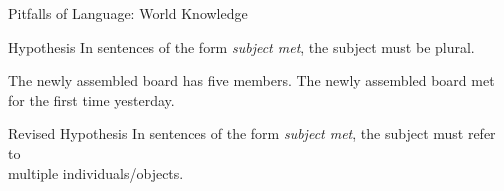 \documentclass[xcolor={usenames,svgnames,x11names,dvipsnames,table}]{beamer}
\begin{document}
\begin{frame}{Pitfalls of Language: World Knowledge}
    \begin{exe}
        \small
        \ex
        \begin{xlist}
        \end{xlist}
        \ex
        \begin{xlist}
        \end{xlist}
    \end{exe}

\pause
    \begin{block}{Hypothesis}
        In sentences of the form \emph{subject met}, the subject must be plural.
    \end{block}

    \pause
    \begin{exe}
        \small
        \ex
        \begin{xlist}
            \ex The newly assembled board has five members.\hfill {}
            \ex The newly assembled board met for the first time yesterday.
        \end{xlist}
    \end{exe}

    \pause
    \begin{block}{Revised Hypothesis}
        In sentences of the form \emph{subject met}, the subject must refer to\\
        multiple individuals\slash objects.
    \end{block}
\end{frame}
\end{document}
